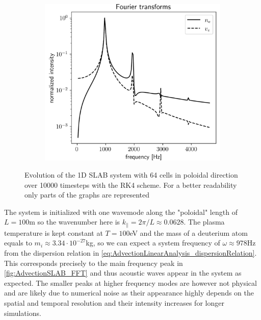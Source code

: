 \begin{figure}[H]
\begin{subfigure}[b]{0.32\textwidth}
		\label{fig:AdvectionSLAB_velocityEvolution}
	\end{subfigure}
	\begin{subfigure}[b]{0.32\textwidth}
		\centering
		\includegraphics[width=1\textwidth]{schemes/AdvectionSLAB_FFT.png}
		\label{fig:AdvectionSLAB_FFT}
	\end{subfigure}
	\caption{Evolution of the 1D SLAB system with 64 cells in poloidal direction over 10000 timesteps with the RK4 scheme. For a better readability only parts of the graphs are represented}
	\label{fig:AdvectionSLAB}
\end{figure}

The system is initialized with one wavemode along the "poloidal" length of $L=100$m so the wavenumber here is $k_\parallel = 2\pi / L \approx 0.0628$. The plasma temperature is kept constant at $T = 100$eV and the mass of a deuterium atom equals to $m_i \approx 3.34\cdot 10^{-27}$kg, so we can expect a system frequency of $\omega\approx 978$Hz from the dispersion relation in \autoref{eq:AdvectionLinearAnalysis_dispersionRelation}. This corresponds precisely to the main frequency peak in \autoref{fig:AdvectionSLAB_FFT} and thus acoustic waves appear in the system as expected. The smaller peaks at higher frequency modes are however not physical and are likely due to numerical noise as their appearance highly depends on the spatial and temporal resolution and their intensity increases for longer simulations. 


